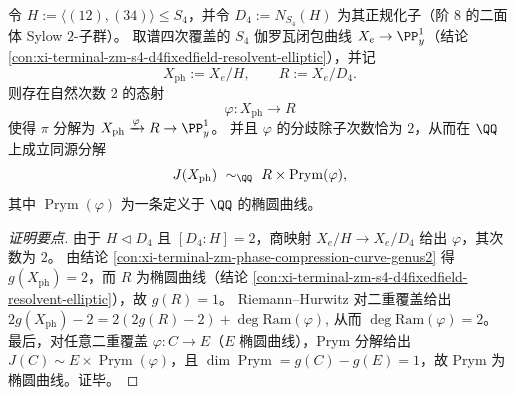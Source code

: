 \begin{conclusion}\label{con:xi-terminal-zm-phase-compression-jacobian-splitting}
令 \(H:=\langle(12),(34)\rangle\le S_4\)，并令 \(D_4:=N_{S_4}(H)\) 为其正规化子（阶 \(8\) 的二面体 Sylow \(2\)-子群）。
取谱四次覆盖的 \(S_4\) 伽罗瓦闭包曲线 \(X_e\to\PP^1_y\)（结论 \ref{con:xi-terminal-zm-s4-d4fixedfield-resolvent-elliptic}），并记
\[
X_{\mathrm{ph}}:=X_e/H,\qquad R:=X_e/D_4.
\]
则存在自然次数 \(2\) 的态射
\[
\varphi:X_{\mathrm{ph}}\longrightarrow R
\]
使得 \(\pi\) 分解为 \(X_{\mathrm{ph}}\xrightarrow{\varphi}R\to\PP^1_y\)。
并且 \(\varphi\) 的分歧除子次数恰为 \(2\)，从而在 \(\QQ\) 上成立同源分解
\[
J(X_{\mathrm{ph}})\ \sim_{\QQ}\ R\times \operatorname{Prym}(\varphi),
\]
其中 \(\operatorname{Prym}(\varphi)\) 为一条定义于 \(\QQ\) 的椭圆曲线。
\end{conclusion}
\begin{proof}[证明要点]
由于 \(H\triangleleft D_4\) 且 \([D_4:H]=2\)，商映射 \(X_e/H\to X_e/D_4\) 给出 \(\varphi\)，其次数为 \(2\)。
由结论 \ref{con:xi-terminal-zm-phase-compression-curve-genus2} 得 \(g(X_{\mathrm{ph}})=2\)，而 \(R\) 为椭圆曲线（结论 \ref{con:xi-terminal-zm-s4-d4fixedfield-resolvent-elliptic}），故 \(g(R)=1\)。
Riemann--Hurwitz 对二重覆盖给出
\(
2g(X_{\mathrm{ph}})-2=2(2g(R)-2)+\deg\mathrm{Ram}(\varphi)
\),
从而 \(\deg\mathrm{Ram}(\varphi)=2\)。
最后，对任意二重覆盖 \(\varphi:C\to E\)（\(E\) 椭圆曲线），Prym 分解给出 \(J(C)\sim E\times \operatorname{Prym}(\varphi)\)，且 \(\dim\operatorname{Prym}=g(C)-g(E)=1\)，故 Prym 为椭圆曲线。证毕。
\end{proof}

